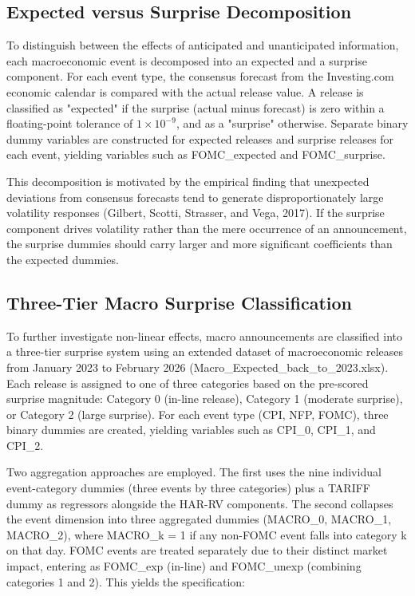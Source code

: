 \documentclass[12pt,a4paper]{report}
\begin{document}
\subsection{Expected versus Surprise Decomposition}
To distinguish between the effects of anticipated and unanticipated information, each macroeconomic event is decomposed into an expected and a surprise component. For each event type, the consensus forecast from the Investing.com economic calendar is compared with the actual release value. A release is classified as "expected" if the surprise (actual minus forecast) is zero within a floating-point tolerance of $1 \times 10^{-9}$, and as a "surprise" otherwise. Separate binary dummy variables are constructed for expected releases and surprise releases for each event, yielding variables such as FOMC_expected and FOMC_surprise.

This decomposition is motivated by the empirical finding that unexpected deviations from consensus forecasts tend to generate disproportionately large volatility responses (Gilbert, Scotti, Strasser, and Vega, 2017). If the surprise component drives volatility rather than the mere occurrence of an announcement, the surprise dummies should carry larger and more significant coefficients than the expected dummies.

\subsection{Three-Tier Macro Surprise Classification}
To further investigate non-linear effects, macro announcements are classified into a three-tier surprise system using an extended dataset of macroeconomic releases from January 2023 to February 2026 (Macro_Expected_back_to_2023.xlsx). Each release is assigned to one of three categories based on the pre-scored surprise magnitude: Category 0 (in-line release), Category 1 (moderate surprise), or Category 2 (large surprise). For each event type (CPI, NFP, FOMC), three binary dummies are created, yielding variables such as CPI_0, CPI_1, and CPI_2.

Two aggregation approaches are employed. The first uses the nine individual event-category dummies (three events by three categories) plus a TARIFF dummy as regressors alongside the HAR-RV components. The second collapses the event dimension into three aggregated dummies (MACRO_0, MACRO_1, MACRO_2), where MACRO_k = 1 if any non-FOMC event falls into category k on that day. FOMC events are treated separately due to their distinct market impact, entering as FOMC_exp (in-line) and FOMC_unexp (combining categories 1 and 2). This yields the specification:
\end{document}
